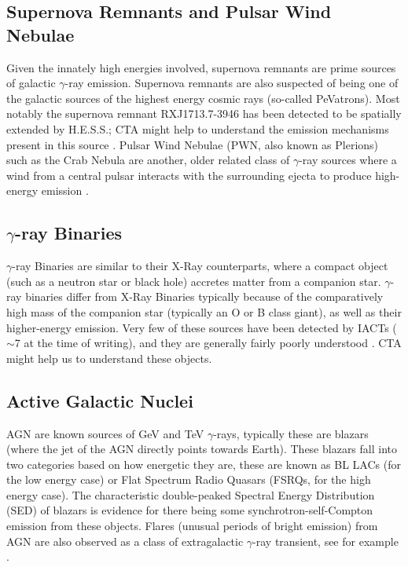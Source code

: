 \subsection{Supernova Remnants and Pulsar Wind Nebulae}
Given the innately high energies involved, supernova remnants are prime sources of galactic $\gamma$-ray emission. Supernova remnants are also suspected of being one of the galactic sources of the highest energy cosmic rays (so-called PeVatrons). Most notably the supernova remnant RXJ1713.7-3946 has been detected to be spatially extended by H.E.S.S.; CTA might help to understand the emission mechanisms present in this source \cite{rxjcta}. Pulsar Wind Nebulae (PWN, also known as Plerions) such as the Crab Nebula are another, older related class of $\gamma$-ray sources where a wind from a central pulsar interacts with the surrounding ejecta to produce high-energy emission \cite{magiccrab}.

\subsection{$\gamma$-ray Binaries}
$\gamma$-ray Binaries are similar to their X-Ray counterparts, where a compact object (such as a neutron star or black hole) accretes matter from a companion star. $\gamma$-ray binaries differ from X-Ray Binaries typically because of the comparatively high mass of the companion star (typically an O or B class giant), as well as their higher-energy emission. Very few of these sources have been detected by IACTs ($\sim$7 at the time of writing), and they are generally fairly poorly understood \cite{scienceCTA}. CTA might help us to understand these objects.

\subsection{Active Galactic Nuclei}
AGN are known sources of GeV and TeV $\gamma$-rays, typically these are blazars (where the jet of the AGN directly points towards Earth). These blazars fall into two categories based on how energetic they are, these are known as BL LACs (for the low energy case) or Flat Spectrum Radio Quasars (FSRQs, for the high energy case). The characteristic double-peaked Spectral Energy Distribution (SED) of blazars is evidence for there being some synchrotron-self-Compton emission from these objects. Flares (unusual periods of bright emission) from AGN are also observed as a class of extragalactic $\gamma$-ray transient, see for example \cite{TXS}.

